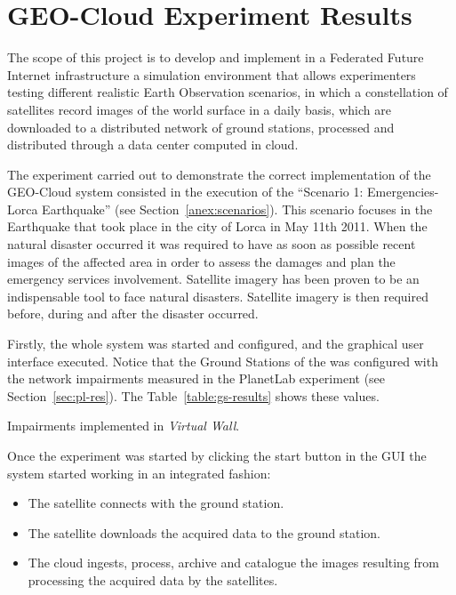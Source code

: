 \section{GEO-Cloud Experiment Results}
\label{sec:geocloud-results}

The scope of this project is to develop and implement in a Federated Future
Internet infrastructure a simulation environment that allows experimenters
testing different realistic Earth Observation scenarios, in which a
constellation of satellites record images of the world surface in a daily basis,
which are downloaded to a distributed network of ground stations, processed and
distributed through a data center computed in cloud.

The experiment carried out to demonstrate the correct implementation of the
GEO-Cloud system consisted in the execution of the ``Scenario 1: Emergencies-Lorca Earthquake'' (see Section~\ref{anex:scenarios}). This scenario focuses in the Earthquake that
took place in the city of Lorca in May 11th 2011. When the natural disaster occurred
it was required to have as soon as possible recent images of the affected area in
order to assess the damages and plan the emergency services
involvement. Satellite imagery has been proven to be an indispensable tool to
face natural disasters. Satellite imagery is then required before, during and
after the disaster occurred. 

Firstly, the whole system was started and configured, and the graphical user
interface executed. Notice that the Ground Stations of the \sss was configured with
the network impairments measured in the PlanetLab experiment (see
Section~\ref{sec:pl-res}). The Table~\ref{table:gs-results} shows these values.

\begin{table}[!h]
  \centering
  {\small
  
  }
  \caption{Impairments implemented in \emph{Virtual Wall}.}
  \label{table:gs-results}
\end{table}



Once the experiment was started by clicking the start button in the \ac{GUI} the system started working in an integrated fashion:
\begin{itemize}
\item The satellite connects with the ground station.
\item The satellite downloads the acquired data to the ground station.
\item The cloud ingests, process, archive and catalogue the images resulting
  from processing the acquired data by the satellites.
\end{itemize}


